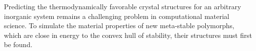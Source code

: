 %



%
Predicting the thermodynamically favorable crystal structures for an arbitrary inorganic system remains a challenging problem in computational material science.\cite{Woodley2008}
%
%
To simulate the material properties of new meta-stable polymorphs, which are close in energy to the convex hull of stability, their structures must first be found.
